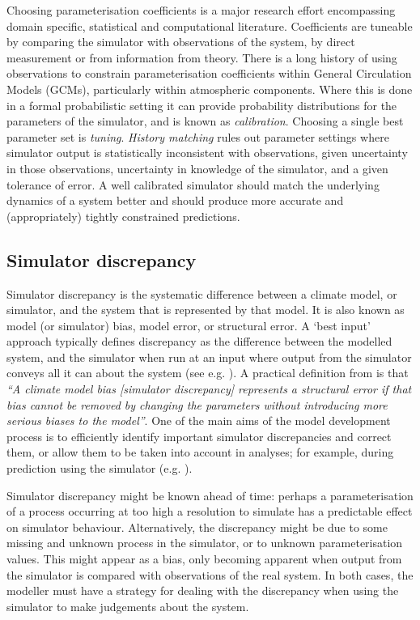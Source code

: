 \documentclass[esd, manuscript]{copernicus}
\begin{document}
Choosing parameterisation coefficients is a major research effort encompassing domain specific, statistical and computational literature. Coefficients are tuneable by comparing the simulator with observations of the system, by direct measurement or from information from theory. There is a long history of using observations to constrain parameterisation coefficients within General Circulation Models (GCMs), particularly within atmospheric components. Where this is done in a formal probabilistic setting it can provide probability distributions for the parameters of the simulator, and is known as \emph{calibration}. Choosing a single best parameter set is \emph{tuning}. \emph{History matching} rules out parameter settings where simulator output is statistically inconsistent with observations, given uncertainty in those observations, uncertainty in knowledge of the simulator, and a given tolerance of error. A well calibrated simulator should match the underlying dynamics of a system better and should produce more accurate and (appropriately) tightly constrained predictions. 

\subsection{Simulator discrepancy}

Simulator discrepancy is the systematic difference between a climate model, or simulator, and the system that is represented by that model. It is also known as model (or simulator) bias, model error, or structural error. A `best input' approach typically defines discrepancy as the difference between the modelled system, and the simulator when run at an input where output from the simulator conveys all it can about the system (see e.g. \cite{goldstein2009reified}). A practical definition from \cite{williamson2014identifying} is that \emph{``A climate model bias [simulator discrepancy] represents a structural error if that bias cannot be removed by changing the parameters without introducing more serious biases to the model''}. One of the main aims of the model development process is to efficiently identify important simulator discrepancies and correct them, or allow them to be taken into account in analyses; for example, during prediction using the simulator (e.g. \cite{sexton2011multivariate}).

Simulator discrepancy might be known ahead of time: perhaps a parameterisation of a process occurring at too high a resolution to simulate has a predictable effect on simulator behaviour. Alternatively, the discrepancy might be due to some missing and unknown process in the simulator, or to unknown parameterisation values. This might appear as a bias, only becoming apparent when output from the simulator is compared with observations of the real system. In both cases, the modeller must have a strategy for dealing with the discrepancy when using the simulator to make judgements about the system.
\end{document}
